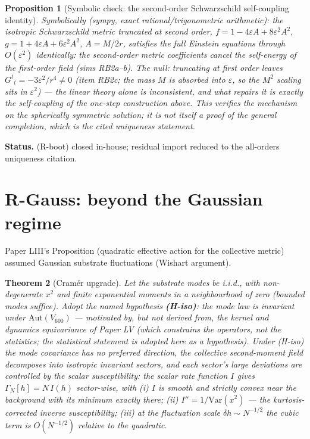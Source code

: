 \documentclass[12pt]{article}
\newtheorem{theorem}{Theorem}
\newtheorem{proposition}[theorem]{Proposition}
\theoremstyle{definition}
\theoremstyle{remark}
\begin{document}
\begin{proposition}[Symbolic check: the second-order Schwarzschild self-coupling identity]\label{prop:rb2}
Symbolically (sympy, exact rational/trigonometric arithmetic): the isotropic Schwarzschild metric truncated at second order, $f = 1 - 4\varepsilon A + 8\varepsilon^2A^2$, $g = 1 + 4\varepsilon A + 6\varepsilon^2A^2$, $A = M/2r$, satisfies the full Einstein equations through $O(\varepsilon^2)$ identically: the second-order metric coefficients cancel the self-energy of the first-order field (sims RB2a--b). The null: truncating at first order leaves $G^t{}_t = -3\varepsilon^2/r^4 \neq 0$ (item RB2c; the mass $M$ is absorbed into $\varepsilon$, so the $M^2$ scaling sits in $\varepsilon^2$) --- the linear theory alone is inconsistent, and what repairs it is exactly the self-coupling of the one-step construction above. This verifies the mechanism on the spherically symmetric solution; it is not itself a proof of the general completion, which is the cited uniqueness statement.
\end{proposition}

\textbf{Status.} (R-boot) closed in-house; residual import reduced to the all-orders uniqueness citation.

\section{R-Gauss: beyond the Gaussian regime}\label{sec:gauss}

Paper LIII's Proposition (quadratic effective action for the collective metric) assumed Gaussian substrate fluctuations (Wishart argument).

\begin{theorem}[Cram\'er upgrade]\label{thm:cramer}
Let the substrate modes be i.i.d., with non-degenerate $x^2$ and finite exponential moments in a neighbourhood of zero (bounded modes suffice). Adopt the named hypothesis \textbf{(H-iso)}: the mode law is invariant under $\mathrm{Aut}(V_{600})$ --- motivated by, but not derived from, the kernel and dynamics equivariance of Paper LV (which constrains the operators, not the statistics; the statistical statement is adopted here as a hypothesis). Under (H-iso) the mode covariance has no preferred direction, the collective second-moment field decomposes into isotropic invariant sectors, and each sector's large deviations are controlled by the scalar susceptibility: the scalar rate function $I$ gives $\Gamma_N[h] = N\,I(h)$ sector-wise, with (i) $I$ is smooth and strictly convex near the background with its minimum exactly there; (ii) $I'' = 1/\mathrm{Var}(x^2)$ --- the kurtosis-corrected inverse susceptibility; (iii) at the fluctuation scale $\delta h \sim N^{-1/2}$ the cubic term is $O(N^{-1/2})$ relative to the quadratic.
\end{theorem}
\end{document}

